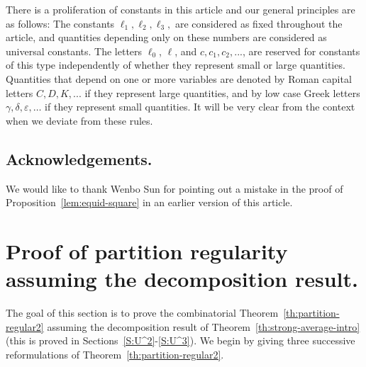 \documentclass[11pt]{amsart}
\theoremstyle{definition}
\begin{document}
\noindent There is a proliferation of constants in this article and
our general principles are as follows: The constants
$\ell_1,\ell_2,\ell_3,$ are considered as fixed throughout the
article, and quantities depending only on these numbers are
considered as universal constants. The letters   $\ell_0$, $\ell$,
and  $c, c_1, c_2,...$,   are reserved for  constants of this type
independently of whether they represent small or large quantities.
Quantities that depend on one or more variables are denoted by Roman
capital letters $C, D, K,...$ if they represent large quantities,
and by low case Greek letters $\gamma, \delta, {\varepsilon},\dots$ if they
represent small quantities. It will be very clear from the context
when we deviate from these rules.

\subsection{Acknowledgements.} We would like to thank Wenbo Sun for pointing out a mistake  in
the proof of Proposition~\ref{lem:equid-square} in  an earlier  version of this article.

\section{Proof of partition regularity assuming the decomposition result.}\label{S:Recurrence}
The goal of this  section is to prove the combinatorial Theorem~\ref{th:partition-regular2} assuming
the decomposition result of Theorem~\ref{th:strong-average-intro}
(this is proved in Sections~\ref{S:U^2}-\ref{S:U^3}).
We begin by giving three successive reformulations of Theorem~\ref{th:partition-regular2}.
\end{document}
